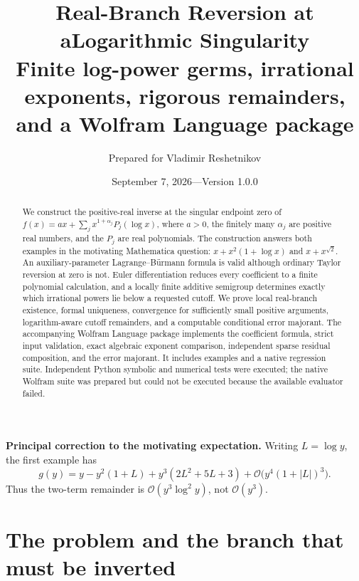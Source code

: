 \documentclass[11pt,a4paper]{article}
\title{\textbf{Real-Branch Reversion at a\newline Logarithmic Singularity}\\[7pt]
\large Finite log-power germs, irrational exponents,\newline
rigorous remainders, and a Wolfram Language package}
\author{Prepared for Vladimir Reshetnikov}
\date{September 7, 2026\quad---\quad Version 1.0.0}
\newcommand{\OO}{\mathcal O}
\theoremstyle{definition}
\begin{document}
\maketitle
\begin{abstract}
We construct the positive-real inverse at the singular endpoint zero of
\(f(x)=a x+\sum_j x^{1+\alpha_j}P_j(\log x)\), where \(a>0\), the finitely many
\(\alpha_j\) are positive real numbers, and the \(P_j\) are real polynomials.
The construction answers both examples in the motivating Mathematica question:
\(x+x^2(1+\log x)\) and \(x+x^{\sqrt2}\). An auxiliary-parameter
Lagrange--B\"urmann formula is valid although ordinary Taylor reversion at zero
is not. Euler differentiation reduces every coefficient to a finite polynomial
calculation, and a locally finite additive semigroup determines exactly which
irrational powers lie below a requested cutoff. We prove local real-branch
existence, formal uniqueness, convergence for sufficiently small positive
arguments, logarithm-aware cutoff remainders, and a computable conditional
error majorant. The accompanying Wolfram Language package implements the
coefficient formula, strict input validation, exact algebraic exponent
comparison, independent sparse residual composition, and the error majorant.
It includes examples and a native regression suite. Independent Python
symbolic and numerical tests were executed; the native Wolfram suite was
prepared but could not be executed because the available evaluator failed.
\end{abstract}
\vspace{5pt}
\noindent\textbf{Principal correction to the motivating expectation.}
Writing \(L=\log y\), the first example has
\[
 g(y)=y-y^2(1+L)+y^3(2L^2+5L+3)+\OO\bigl(y^4(1+|L|)^3\bigr).
\]
Thus the two-term remainder is \(\OO(y^3\log^2 y)\), not \(\OO(y^3)\).
\newpage
\tableofcontents
\newpage

\section{The problem and the branch that must be inverted}
\end{document}

